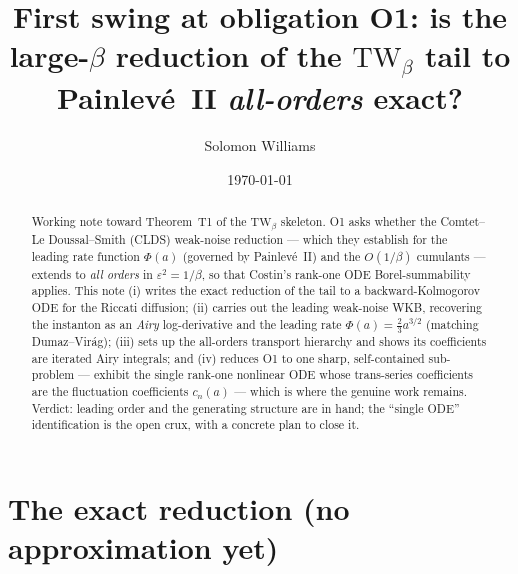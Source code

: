 \documentclass[11pt,reqno]{amsart}
\theoremstyle{plain}
\theoremstyle{remark}
\newcommand{\eps}{\varepsilon}
\begin{document}
\title[First swing at O1]{First swing at obligation O1: is the large-$\beta$ reduction of the
$\mathrm{TW}_\beta$ tail to Painlev\'e~II \emph{all-orders} exact?}
\author{Solomon Williams}
\date{\today}

\begin{abstract}
Working note toward Theorem~T1 of the $\mathrm{TW}_\beta$ skeleton. O1 asks whether the
Comtet--Le Doussal--Smith (CLDS) weak-noise reduction --- which they establish for the leading
rate function $\Phi(a)$ (governed by Painlev\'e~II) and the $O(1/\beta)$ cumulants --- extends to
\emph{all orders} in $\eps^2=1/\beta$, so that Costin's rank-one ODE Borel-summability applies.
This note (i) writes the exact reduction of the tail to a backward-Kolmogorov ODE for the
Riccati diffusion; (ii) carries out the leading weak-noise WKB, recovering the instanton as an
\emph{Airy} log-derivative and the leading rate $\Phi(a)=\tfrac23 a^{3/2}$ (matching
Dumaz--Vir\'ag); (iii) sets up the all-orders transport hierarchy and shows its coefficients are
iterated Airy integrals; and (iv) reduces O1 to one sharp, self-contained sub-problem --- exhibit
the single rank-one nonlinear ODE whose trans-series coefficients are the fluctuation
coefficients $c_n(a)$ --- which is where the genuine work remains. Verdict: leading order and the
generating structure are in hand; the ``single ODE'' identification is the open crux, with a
concrete plan to close it.
\end{abstract}

\maketitle

\section{The exact reduction (no approximation yet)}
\end{document}
